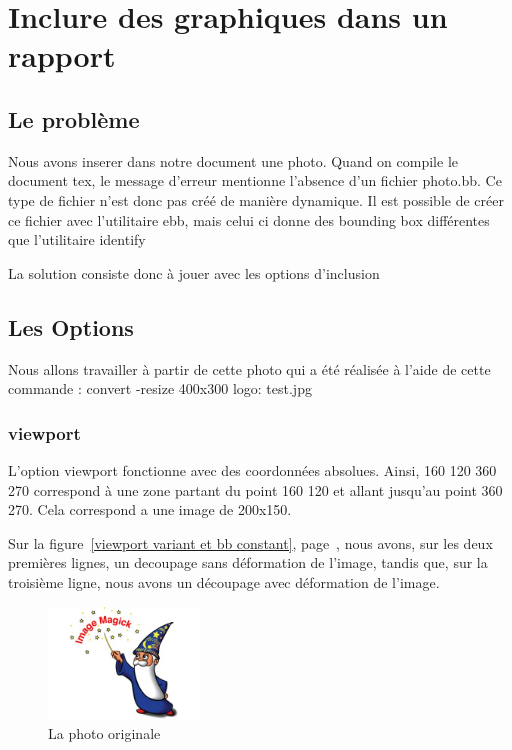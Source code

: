 
\section{Inclure des graphiques dans un rapport}
\subsection{Le problème}
Nous avons inserer dans notre document une photo.
Quand on compile le document tex, le message d'erreur mentionne l'absence d'un fichier photo.bb.
Ce type de fichier n'est donc pas créé de manière dynamique.
Il est possible de créer ce fichier avec l'utilitaire ebb, mais celui ci donne des bounding box
différentes que l'utilitaire identify

La solution consiste donc à jouer avec les options d'inclusion

\subsection{Les Options}

Nous allons travailler à partir de cette photo qui a été réalisée à l'aide de cette commande :
convert -resize 400x300 logo: test.jpg

\subsubsection{viewport}

L'option viewport fonctionne avec des coordonnées absolues.
Ainsi, {160 120 360 270} correspond à une zone partant du point {160 120}
et allant jusqu'au point {360 270}.
Cela correspond a une image de 200x150.

Sur la figure~\ref{viewport variant et bb constant}, page~\pageref{viewport variant et bb constant},
nous avons, sur les deux premières lignes, un decoupage sans déformation de l'image, 
tandis que, sur la troisième ligne, nous avons un découpage avec déformation de l'image.

\begin{figure}[!h]
  \centering
  \includegraphics[bb=0 0 400 300,height=3cm]{test.jpg}
  \caption{La photo originale}
  \label{Photo originale}
\end{figure}

